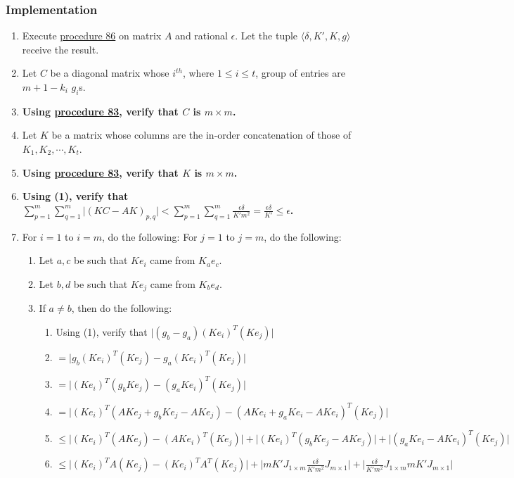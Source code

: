 \documentclass[twocolumn]{article}
\begin{document}
			\subsubsection{Implementation}
				\begin{enumerate}
					\item Execute \hyperref[sec:procedure 86]{procedure 86} on matrix $A$ and rational $\epsilon$. Let the tuple $\langle\delta,K',K,g\rangle$ receive the result.
					\item Let $C$ be a diagonal matrix whose $i^{th}$, where $1\le i\le t$, group of entries are $m+1-k_i$ $g_i$s.
					\item \textbf{Using \hyperref[sec:procedure 83]{procedure 83}, verify that $C$ is $m\times m$.}
					\item Let $K$ be a matrix whose columns are the in-order concatenation of those of $K_1,K_2,\cdots,K_t$.
					\item \textbf{Using \hyperref[sec:procedure 83]{procedure 83}, verify that $K$ is $m\times m$.}
					\item \textbf{Using (1), verify that $\sum_{p=1}^m\sum_{q=1}^m\lvert(KC-AK)_{p,q}\rvert<\sum_{p=1}^m\sum_{q=1}^m \frac{\epsilon\delta}{K'm^2}=\frac{\epsilon\delta}{K'}\le\epsilon$.}
					\item For $i=1$ to $i=m$, do the following: For $j=1$ to $j=m$, do the following:
					\begin{enumerate}
						\item Let $a,c$ be such that $Ke_i$ came from $K_ae_c$.
						\item Let $b,d$ be such that $Ke_j$ came from $K_be_d$.
						\item If $a\ne b$, then do the following:
						\begin{enumerate}
							\item Using (1), verify that $\lvert(g_b-g_a)(Ke_i)^T(Ke_j)\rvert$
							\item $=\lvert g_b(Ke_i)^T(Ke_j)-g_a(Ke_i)^T(Ke_j)\rvert$
							\item $=\lvert(Ke_i)^T(g_bKe_j)-(g_aKe_i)^T(Ke_j)\rvert$
							\item $=\lvert(Ke_i)^T(AKe_j+g_bKe_j-AKe_j)-(AKe_i+g_aKe_i-AKe_i)^T(Ke_j)\rvert$
							\item $\le\lvert(Ke_i)^T(AKe_j)-(AKe_i)^T(Ke_j)\rvert+\lvert(Ke_i)^T(g_bKe_j-AKe_j)\rvert+\lvert(g_aKe_i-AKe_i)^T(Ke_j)\rvert$
							\item $\le\lvert(Ke_i)^TA(Ke_j)-(Ke_i)^TA^T(Ke_j)\rvert+\lvert mK'J_{1\times m}\frac{\epsilon\delta}{K'm^2}J_{m\times 1}\rvert+\lvert\frac{\epsilon\delta}{K'm^2}J_{1\times m}mK'J_{m\times 1}\rvert$

\end{enumerate}
\end{enumerate}
\end{enumerate}
\end{document}
